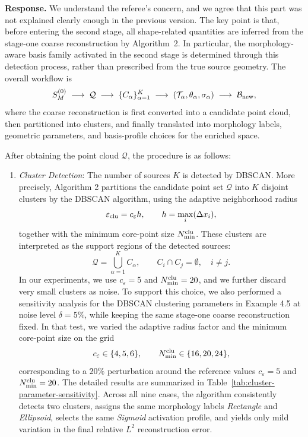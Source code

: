 \documentclass[11pt]{article}
\newcommand{\response}[1]{\vspace{0.2em}\noindent\textbf{Response.} #1}
\begin{document}
\response{We understand the referee's concern, and we agree that this part was not explained clearly enough in the previous version. The key point is that, before entering the second stage, all shape-related quantities are inferred from the stage-one coarse reconstruction by Algorithm~2. In particular, the morphology-aware basis family activated in the second stage is determined through this detection process, rather than prescribed from the true source geometry. The overall workflow is
\[
S^{(0)}_{M}\;\longrightarrow\; \mathcal{Q}\;\longrightarrow\; \{C_{\alpha}\}_{\alpha=1}^{K}\;\longrightarrow\; (\mathcal{T}_{\alpha},\theta_{\alpha},\sigma_{\alpha})\;\longrightarrow\;\mathcal{B}_{\rm new},
\]
where the coarse reconstruction is first converted into a candidate point cloud, then partitioned into clusters, and finally translated into morphology labels, geometric parameters, and basis-profile choices for the enriched space.

After obtaining the point cloud $\mathcal{Q}$, the procedure is as follows:
\begin{enumerate}
    \item \textit{Cluster Detection}: The number of sources $K$ is detected by DBSCAN. More precisely, Algorithm 2 partitions the candidate point set $\mathcal{Q}$ into $K$ disjoint clusters by the DBSCAN algorithm, using the adaptive neighborhood radius
    \[
  \varepsilon_{\rm clu}=c_\varepsilon h,\qquad
  h=\max_i(\Delta x_i),
  \]
  together with the minimum core-point size $N_{\min}^{\rm clu}$. These clusters are interpreted as the support regions of the detected sources:
    \[
    \mathcal{Q}=\bigcup_{\alpha=1}^{K} C_\alpha,\qquad
    C_i\cap C_j=\emptyset,\quad i\neq j.
    \]
    In our experiments, we use $c_\varepsilon=5$ and $N_{\min}^{\rm clu}=20$, and we further discard very small clusters as noise. To support this choice, we also performed a sensitivity analysis for the DBSCAN clustering parameters in Example 4.5 at noise level $\delta=5\%$, while keeping the same stage-one coarse reconstruction fixed. In that test, we varied the adaptive radius factor and the minimum core-point size on the grid
    \[
    c_{\varepsilon}\in\{4,5,6\}, \qquad N_{\min}^{\rm clu}\in\{16,20,24\},
    \]
    corresponding to a $20\%$ perturbation around the reference values $c_{\varepsilon}=5$ and $N_{\min}^{\rm clu}=20$. The detailed results are summarized in Table~\ref{tab:cluster-parameter-sensitivity}. Across all nine cases, the algorithm consistently detects two clusters, assigns the same morphology labels \emph{Rectangle} and \emph{Ellipsoid}, selects the same \emph{Sigmoid} activation profile, and yields only mild variation in the final relative $L^2$ reconstruction error.


\end{enumerate}}
\end{document}
